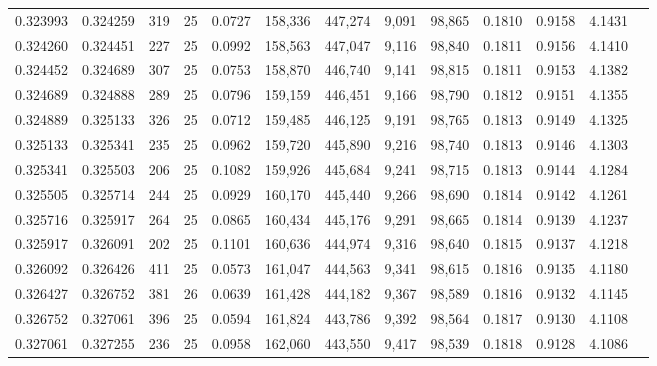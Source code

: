 \begin{tabular}{rrrrrrrrrrrrr}
0.323993 & 0.324259 &   319 &  25 &                                     0.0727 & 158,336 & 447,274 &   9,091 &  98,865 & 0.1810 & 0.9158 & 4.1431 \\
0.324260 & 0.324451 &   227 &  25 &                                     0.0992 & 158,563 & 447,047 &   9,116 &  98,840 & 0.1811 & 0.9156 & 4.1410 \\
0.324452 & 0.324689 &   307 &  25 &                                     0.0753 & 158,870 & 446,740 &   9,141 &  98,815 & 0.1811 & 0.9153 & 4.1382 \\
0.324689 & 0.324888 &   289 &  25 &                                     0.0796 & 159,159 & 446,451 &   9,166 &  98,790 & 0.1812 & 0.9151 & 4.1355 \\
0.324889 & 0.325133 &   326 &  25 &                                     0.0712 & 159,485 & 446,125 &   9,191 &  98,765 & 0.1813 & 0.9149 & 4.1325 \\
0.325133 & 0.325341 &   235 &  25 &                                     0.0962 & 159,720 & 445,890 &   9,216 &  98,740 & 0.1813 & 0.9146 & 4.1303 \\
0.325341 & 0.325503 &   206 &  25 &                                     0.1082 & 159,926 & 445,684 &   9,241 &  98,715 & 0.1813 & 0.9144 & 4.1284 \\
0.325505 & 0.325714 &   244 &  25 &                                     0.0929 & 160,170 & 445,440 &   9,266 &  98,690 & 0.1814 & 0.9142 & 4.1261 \\
0.325716 & 0.325917 &   264 &  25 &                                     0.0865 & 160,434 & 445,176 &   9,291 &  98,665 & 0.1814 & 0.9139 & 4.1237 \\
0.325917 & 0.326091 &   202 &  25 &                                     0.1101 & 160,636 & 444,974 &   9,316 &  98,640 & 0.1815 & 0.9137 & 4.1218 \\
0.326092 & 0.326426 &   411 &  25 &                                     0.0573 & 161,047 & 444,563 &   9,341 &  98,615 & 0.1816 & 0.9135 & 4.1180 \\
0.326427 & 0.326752 &   381 &  26 &                                     0.0639 & 161,428 & 444,182 &   9,367 &  98,589 & 0.1816 & 0.9132 & 4.1145 \\
0.326752 & 0.327061 &   396 &  25 &                                     0.0594 & 161,824 & 443,786 &   9,392 &  98,564 & 0.1817 & 0.9130 & 4.1108 \\
0.327061 & 0.327255 &   236 &  25 &                                     0.0958 & 162,060 & 443,550 &   9,417 &  98,539 & 0.1818 & 0.9128 & 4.1086 \\

\end{tabular}
